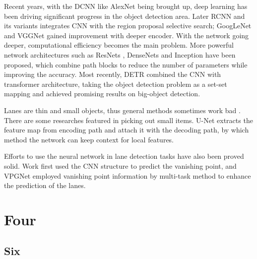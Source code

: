 \begin{spacing}{1.5}
Recent years, with the DCNN like AlexNet \cite{krizhevsky2012imagenet} being brought up, deep learning has been driving significant progress in the object detection area. Later RCNN and its variants \cite{girshick2014rich, girshick2015fast, ren2015faster} integrates CNN with the region proposal selective search; GoogLeNet \cite{szegedy2015going} and VGGNet \cite{simonyan2014very} gained improvement with deeper encoder. With the network going deeper, computational efficiency becomes the main problem. More powerful network architectures such as ResNets \cite{he2016deep}, DenseNets \cite{huang2017densely} and Inception \cite{ioffe2015batch} have been proposed, which combine path blocks to reduce the number of parameters while improving the accuracy. Most recently, DETR \cite{carion2020end} combined the CNN with transformer architecture, taking the object detection problem as a set-set mapping and achieved promising results on big-object detection.

Lanes are thin and small objects, thus general methods sometimes work bad \cite{tang2020review}. There are some researches featured in picking out small items. U-Net \cite{ronneberger2015unet} extracts the feature map from encoding path and attach it with the decoding path, by which method the network can keep context for local features.

Efforts to use the neural network in lane detection tasks have also been proved solid. Work \cite{borji2016vanishing} first used the CNN structure to predict the vanishing point, and VPGNet \cite{lee2017vpgnet} employed vanishing point information by multi-task method to enhance the prediction of the lanes.

\section{Four}

\subsection{Six}


\end{spacing}
\newpage
